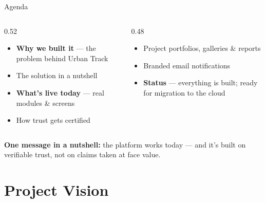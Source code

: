 \documentclass[aspectratio=169, 10pt]{beamer}
\newcommand{\keypoint}[1]{%
  \begin{tcolorbox}[enhanced, colback=utlight, colframe=utteal,
    boxrule=0pt, leftrule=3pt, arc=2pt, boxsep=4pt, left=6pt, right=6pt, top=4pt, bottom=4pt]
    \color{utnavy}#1
  \end{tcolorbox}%
}
\begin{document}
\begin{frame}{Agenda}
  \begin{columns}[T]
    \begin{column}{0.52\textwidth}
      \begin{itemize}
        \item \textbf{Why we built it} --- the problem behind Urban Track
        \item The solution in a nutshell
        \item \textbf{What's live today} --- real modules \& screens
        \item How trust gets certified
      \end{itemize}
    \end{column}
    \begin{column}{0.48\textwidth}
      \begin{itemize}
        \item Project portfolios, galleries \& reports
        \item Branded email notifications
        \item \textbf{Status} --- everything is built; ready for migration to the cloud
      \end{itemize}
    \end{column}
  \end{columns}
  \vspace{0.5cm}
  \keypoint{\textbf{One message in a nutshell:} the platform works today --- and it's built on verifiable trust, not on claims taken at face value.}
\end{frame}

\section{Project Vision}
\end{document}
